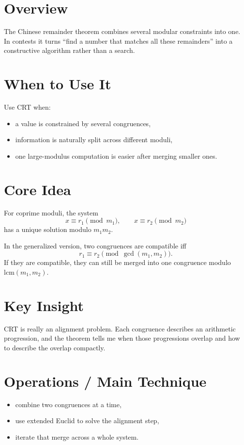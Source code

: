 \section*{Overview}

The Chinese remainder theorem combines several modular constraints into one. In contests it turns ``find a number that
matches all these remainders'' into a constructive algorithm rather than a search.

\section*{When to Use It}

Use CRT when:

\begin{itemize}
  \item a value is constrained by several congruences,
  \item information is naturally split across different moduli,
  \item one large-modulus computation is easier after merging smaller ones.
\end{itemize}

\section*{Core Idea}

For coprime moduli, the system
\[
x \equiv r_1 \pmod{m_1}, \qquad x \equiv r_2 \pmod{m_2}
\]
has a unique solution modulo \(m_1 m_2\).

In the generalized version, two congruences are compatible iff
\[
r_1 \equiv r_2 \pmod{\gcd(m_1, m_2)}.
\]
If they are compatible, they can still be merged into one congruence modulo \(\mathrm{lcm}(m_1, m_2)\).

\section*{Key Insight}

CRT is really an alignment problem. Each congruence describes an arithmetic progression, and the theorem tells me when
those progressions overlap and how to describe the overlap compactly.

\section*{Operations / Main Technique}

\begin{itemize}
  \item combine two congruences at a time,
  \item use extended Euclid to solve the alignment step,
  \item iterate that merge across a whole system.
\end{itemize}

